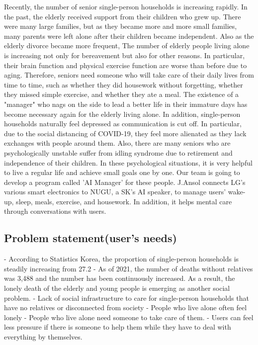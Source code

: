 \documentclass[conference]{IEEEtran}
\begin{document}
Recently, the number of senior  single-person households is increasing rapidly. In the past, the elderly received support from their children who grew up. There were many large  families, but as they became more and more small families, many parents were left alone after their children became independent. Also as the elderly divorce became more frequent, The number of elderly people living alone is increasing not only for bereavement but also for other reasons.
\newline
In particular, their brain function and physical exercise function are worse than before due to aging. Therefore, seniors need someone who will take care of their daily lives from time to time, such as whether they did housework without forgetting, whether they missed simple exercise, and whether they ate a meal. The existence of a "manager" who nags on the side to lead a better life in their immature days has become necessary again for the elderly living alone.
\newline
In addition, single-person households naturally feel depressed as communication is cut off. In particular, due to the social distancing of COVID-19, they feel more alienated as they lack exchanges with people around them. Also, there are many seniors who are psychologically unstable suffer from idling syndrome due to retirement  and independence of their children. In these psychological situations, it is very helpful to live a regular life and achieve small goals one by one.
\newline
Our team is going to develop a program called 'AI Manager' for these people. J.Ansol connects LG's various smart electronics to NUGU, a SK’s AI speaker, to manage users' wake-up, sleep, meals, exercise, and housework. In addition, it helps mental care through conversations with users.


\subsection{Problem statement(user's needs)}

- According to Statistics Korea, the proportion of single-person households is steadily increasing from 27.2%
\newline
\newline
- As of 2021, the number of deaths without relatives was 3,488 and the number has been continuously increased. As a result, the lonely death of the elderly and young people is emerging as another social problem.
\newline
\newline
- Lack of social infrastructure to care for single-person households that have no relatives or disconnected from society
\newline
\newline
- People who live alone often feel lonely
\newline
\newline
- People who live alone need someone to take care of them.
\newline
\newline
- Users can feel less pressure if there is someone to help them while they have to deal with everything by themselves.
\end{document}
